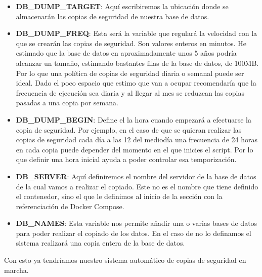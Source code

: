 \begin{itemize}
    \item \textbf{DB\_DUMP\_TARGET}: Aquí escribiremos la ubicación donde se almacenarán las copias de seguridad de nuestra base de datos.
    \item \textbf{DB\_DUMP\_FREQ}: Esta será la variable que regulará la velocidad con la que se crearán las copias de seguridad. Son valores enteros en minutos. He estimado que la base de datos en aproximadamente unos 5 años podría alcanzar un tamaño, estimando bastantes filas de la base de datos, de 100MB. Por lo que una política de copias de seguridad diaria o semanal puede ser ideal. Dado el poco espacio que estimo que van a ocupar recomendaría que la frecuencia de ejecución sea diaria y al llegar al mes se reduzcan las copias pasadas a una copia por semana.
    \item \textbf{DB\_DUMP\_BEGIN}: Define el la hora cuando empezará a efectuarse la copia de seguridad. Por ejemplo, en el caso de que se quieran realizar las copias de seguridad cada día a las 12 del mediodía una frecuencia de 24 horas en cada copia puede depender del momento en el que inicies el script. Por lo que definir una hora inicial ayuda a poder controlar esa temporización.
    \item \textbf{DB\_SERVER}: Aquí definiremos el nombre del servidor de la base de datos de la cual vamos a realizar el copiado. Este no es el nombre que tiene definido el contenedor, sino el que le definimos al inicio de la sección con la referenciación de Docker Compose.
    \item \textbf{DB\_NAMES}: Esta variable nos permite añadir una o varias bases de datos para poder realizar el copiado de los datos. En el caso de no lo definamos el sistema realizará una copia entera de la base de datos.
\end{itemize}
\vspace{\baselineskip}
Con esto ya tendríamos nuestro sistema automático de copias de seguridad en marcha.